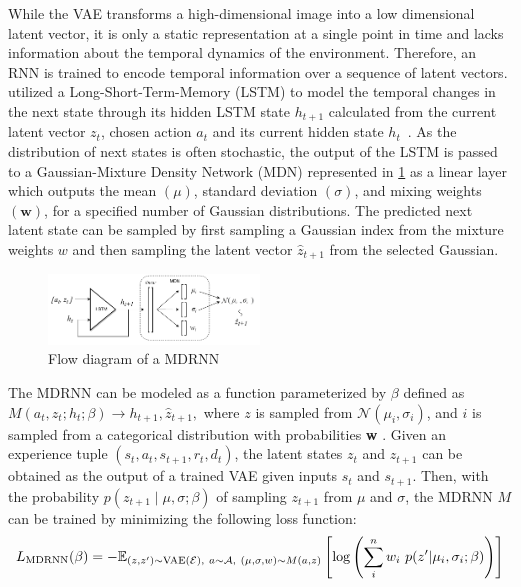 While the VAE transforms a high-dimensional image into a low dimensional latent vector, it is only a static representation at a single point in time and lacks information about the temporal dynamics of the environment. Therefore, an RNN is trained to encode temporal information over a sequence of latent vectors.  utilized a Long-Short-Term-Memory (LSTM) to model the temporal changes in the next state through its hidden LSTM state $h_{t+1}$ calculated from the current latent vector $z_t$, chosen action $a_t$ and its current hidden state $h_t$~\cite{ha2018recurrent}. As the distribution of next states is often stochastic, the output of the LSTM is passed to a Gaussian-Mixture Density Network (MDN) \cite{bishop1994mixture} represented in \cref{fig:mdrnn} as a linear layer which outputs the mean $(\mu)$, standard deviation $(\sigma)$, and mixing weights $(\textbf{w})$, for a specified number of Gaussian distributions. The predicted next latent state can be sampled by first sampling a Gaussian index from the mixture weights $w$ and then sampling the latent vector $\hat{z}_{t+1}$ from the selected Gaussian. 
\begin{figure}[h]
	\centering
	\includegraphics[width=0.5\textwidth]{images/MDRNN3.pdf}
	\caption{Flow diagram of a MDRNN}\label{fig:mdrnn}
\end{figure}

The MDRNN can be modeled as a function parameterized by $\beta$ defined as $ M(a_t,z_t;h_t;\beta) \rightarrow h_{t+1}, \hat{z}_{t+1},$ where $z$ is sampled from $\mathcal{N}(\mu_i, \sigma_i)$, and $i$ is sampled from a categorical distribution with probabilities \textbf{w} \cite{ellefsen2019mixture}. Given an experience tuple $(s_t, a_t, s_{t+1}, r_t, d_t)$, the latent states $z_t$ and $z_{t+1}$ can be obtained as the output of a trained VAE given inputs $s_t$ and $s_{t+1}$. Then, with the probability $p(z_{t+1} \mid \mu,\sigma;\beta)$ of sampling $z_{t+1}$ from $\mu$ and $\sigma$, the MDRNN $M$ can be trained by minimizing the following loss function:
\begin{dmath}
	L_{\mathrm{MDRNN}}(\beta) = -\mathbb{E}_{(z,z') \sim \mathrm{VAE}(\mathcal{E}),\ a \sim \mathcal{A},\ (\mu,\sigma,w) \sim M(a,z)} \\ \left[ \log \left( \sum^n_i w_i \ p(z' | \mu_i,\sigma_i;\beta) \right) \right] 
\end{dmath} 

